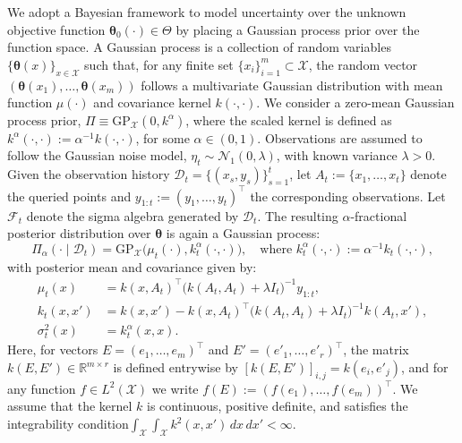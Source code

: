 \documentclass[final,12pt]{colt2026} %
\begin{document}
We adopt a Bayesian framework to model uncertainty over the unknown objective function $\pmb\theta_0(\cdot) \in \Theta$ by placing a Gaussian process prior over the function space. A Gaussian process is a collection of random variables $\{\pmb\theta(x)\}_{x \in \mathcal{X}}$ such that, for any finite set $\{x_i\}_{i=1}^m \subset \mathcal{X}$, the random vector $(\pmb\theta(x_1), \ldots, \pmb\theta(x_m))$ follows a multivariate Gaussian distribution with mean function $\mu(\cdot)$ and covariance kernel $k(\cdot,\cdot)$. We consider a zero-mean Gaussian process prior, $\Pi \equiv \mathrm{GP}_{\mathcal{X}}(0, k^\alpha)$, where the scaled kernel is defined as $k^\alpha(\cdot,\cdot) := \alpha^{-1} k(\cdot,\cdot)$, for some $\alpha \in (0,1)$. Observations are assumed to follow the Gaussian noise model, $\eta_t \sim \mathcal{N}_1(0,\lambda)$, with known variance $\lambda > 0$. Given the observation history $\mathcal{D}_t = \{(x_s, y_s)\}_{s=1}^t$, let $A_t := \{x_1,\ldots,x_t\}$ denote the queried points and $y_{1:t} := (y_1,\ldots,y_t)^\top$ the corresponding observations.
Let $\mathcal{F}_t$ denote the sigma algebra generated by $\mathcal{D}_t$.
The resulting $\alpha$-fractional posterior distribution over $\pmb\theta$ is again a Gaussian process:
\[
\Pi_\alpha(\cdot \mid \mathcal{D}_t)
= \mathrm{GP}_{\mathcal{X}}\big(\mu_t(\cdot), k_t^\alpha(\cdot,\cdot)\big),
\quad \text{where } k_t^\alpha(\cdot,\cdot) := \alpha^{-1} k_t(\cdot,\cdot),
\]
with posterior mean and covariance given by:
\begin{align}
\label{eq:fractional-posterior-updates}
\mu_t(x)
&= k(x, A_t)^\top \big(k(A_t, A_t) + \lambda I_t\big)^{-1} y_{1:t}, \\
k_t(x,x')
&= k(x,x') - k(x, A_t)^\top \big(k(A_t, A_t) + \lambda I_t\big)^{-1} k(A_t, x'), \\
\sigma_t^2(x)
&= k_t^\alpha(x,x).
\end{align}
Here, for vectors $E = (e_1,\ldots,e_m)^\top$ and $E' = (e'_1,\ldots,e'_r)^\top$, the matrix $k(E,E') \in \mathbb{R}^{m \times r}$ is defined entrywise by $[k(E,E')]_{i,j} = k(e_i,e'_j)$, and for any function $f \in L^2(\mathcal{X})$ we write $f(E) := (f(e_1),\ldots,f(e_m))^\top$. We assume that the kernel $k$ is continuous, positive definite, and satisfies the integrability condition\(
\int_{\mathcal{X}} \int_{\mathcal{X}} k^2(x,x') \, dx \, dx' < \infty.\)
\end{document}
